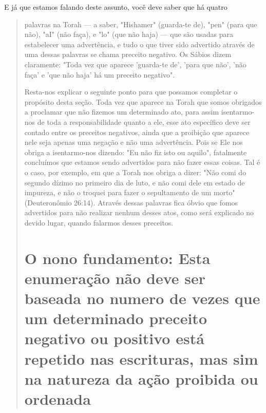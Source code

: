 E já que estamos falando deste assunto, você deve saber que há quatro

\begin{quote}palavras na Torah --- a saber, "Hishamer" (guarda-te de), "pen" (para
que não), "aI" (não faça), e "lo" (que não haja) --- que são usadas para
estabelecer uma ad­vertência, e tudo o que tiver sido advertido através
de uma dessas palavras se cha­ma preceito negativo. Os Sábios dizem
claramente: "Toda vez que aparece 'guar­da-te de', 'para que não', 'não
faça' e 'que não haja' há um preceito negativo".

Resta-nos explicar o seguinte ponto para que possamos completar o
propósito desta seção. Toda vez que aparece na Torah que somos obrigados
a proclamar que não fizemos um determinado ato, para assim isentarmo-nos
de toda a responsabilidade quanto a ele, esse ato específico deve ser
contado entre os preceitos negativos, ainda que a proibição que aparece
nele seja ape­nas uma negação e não uma advertência. Pois se Ele nos
obriga a isentarmo-nos dizendo: "Eu não fiz isto ou aquilo", fatalmente
concluímos que estamos sen­do advertidos para não fazer essas coisas.
Tal é o caso, por exemplo, em que a Torah nos obriga a dizer: "Não comi
do segundo dízimo no primeiro dia de luto, e não comi dele em estado de
impureza, e não o troquei para fazer o se­pultamento de um morto"
(Deuteronômio 26:14). Através dessas palavras fica óbvio que fomos
advertidos para não realizar nenhum desses atos, como será explicado no
devido lugar, quando falarmos desses preceitos.

\chapter{O nono fundamento: Esta enumeração não deve ser baseada 
no numero de vezes que um determinado preceito negativo ou 
positivo está repetido nas escrituras, mas sim na natureza da ação proibida ou ordenada}


\end{quote}
